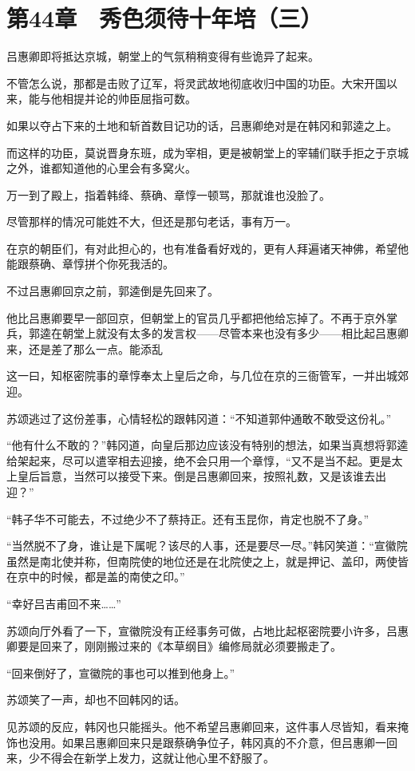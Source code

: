 \section{第44章　秀色须待十年培（三）}

吕惠卿即将抵达京城，朝堂上的气氛稍稍变得有些诡异了起来。

不管怎么说，那都是击败了辽军，将灵武故地彻底收归中国的功臣。大宋开国以来，能与他相提并论的帅臣屈指可数。

如果以夺占下来的土地和斩首数目记功的话，吕惠卿绝对是在韩冈和郭逵之上。

而这样的功臣，莫说晋身东班，成为宰相，更是被朝堂上的宰辅们联手拒之于京城之外，谁都知道他的心里会有多窝火。

万一到了殿上，指着韩绛、蔡确、章惇一顿骂，那就谁也没脸了。

尽管那样的情况可能姓不大，但还是那句老话，事有万一。

在京的朝臣们，有对此担心的，也有准备看好戏的，更有人拜遍诸天神佛，希望他能跟蔡确、章惇拼个你死我活的。

不过吕惠卿回京之前，郭逵倒是先回来了。

他比吕惠卿要早一部回京，但朝堂上的官员几乎都把他给忘掉了。不再于京外掌兵，郭逵在朝堂上就没有太多的发言权——尽管本来也没有多少——相比起吕惠卿来，还是差了那么一点。能添乱

这一曰，知枢密院事的章惇奉太上皇后之命，与几位在京的三衙管军，一并出城郊迎。

苏颂逃过了这份差事，心情轻松的跟韩冈道：“不知道郭仲通敢不敢受这份礼。”

“他有什么不敢的？”韩冈道，向皇后那边应该没有特别的想法，如果当真想将郭逵给架起来，尽可以遣宰相去迎接，绝不会只用一个章惇，“又不是当不起。更是太上皇后旨意，当然可以接受下来。倒是吕惠卿回来，按照礼数，又是该谁去出迎？”

“韩子华不可能去，不过绝少不了蔡持正。还有玉昆你，肯定也脱不了身。”

“当然脱不了身，谁让是下属呢？该尽的人事，还是要尽一尽。”韩冈笑道：“宣徽院虽然是南北使并称，但南院使的地位还是在北院使之上，就是押记、盖印，两使皆在京中的时候，都是盖的南使之印。”

“幸好吕吉甫回不来……”

苏颂向厅外看了一下，宣徽院没有正经事务可做，占地比起枢密院要小许多，吕惠卿要是回来了，刚刚搬过来的《本草纲目》编修局就必须要搬走了。

“回来倒好了，宣徽院的事也可以推到他身上。”

苏颂笑了一声，却也不回韩冈的话。

见苏颂的反应，韩冈也只能摇头。他不希望吕惠卿回来，这件事人尽皆知，看来掩饰也没用。如果吕惠卿回来只是跟蔡确争位子，韩冈真的不介意，但吕惠卿一回来，少不得会在新学上发力，这就让他心里不舒服了。

